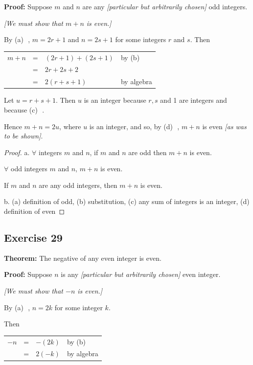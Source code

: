 \documentclass[14pt]{extarticle}
\newcommand{\fbl}{\underline{\hspace{1cm}}\,\,}
\newcommand{\fa}{\forall}
\newcommand{\cy}{\color{cyan}}
\begin{document}
{\bf Proof:} Suppose $m$ and $n$ are any {\it [particular but arbitrarily chosen]} odd integers. 

{\it [We must show that $m + n$ is even.]}

By {\cy (a)} \fbl, $m = 2r + 1$ and $n = 2s + 1$ for some integers $r$ and $s$. Then

\begin{center}
\begin{tabular}{rcll}
$m+n$ & = & $(2r+1) + (2s+1)$ & {\cy by (b)} \fbl \\
& = & $2r + 2s + 2$ & \\
& = & $2(r+s+1)$ & \cy by algebra \\
\end{tabular}
\end{center}

Let $u = r + s + 1$. Then $u$ is an integer because $r, s$ and 1 are integers and because {\cy (c)} \fbl. 

Hence $m + n = 2u$, where $u$ is an integer, and so, by {\cy (d)} \fbl, $m + n$ is even {\it [as was to be shown]}.

\begin{proof}
a. $\fa$ integers $m$ and $n$, if $m$ and $n$ are odd then $m + n$ is even.

$\fa$ odd integers $m$ and $n$, $m + n$ is even.

If $m$ and $n$ are any odd integers, then $m + n$ is even.

b. (a) definition of odd, (b) substitution, (c) any sum of
integers is an integer, (d) definition of even
\end{proof}

\subsection{Exercise 29}
{\bf Theorem:} The negative of any even integer is even.

{\bf Proof:} Suppose $n$ is any {\it [particular but arbitrarily chosen]} even integer. 

{\it [We must show that $-n$ is even.]}

By {\cy (a)} \fbl, $n = 2k$ for some integer $k$.

Then

\begin{center}
\begin{tabular}{rcll}
$-n$ & = & $-(2k)$ & \cy by (b) \fbl \\
& = & $2(-k)$ & \cy by algebra \\
\end{tabular}
\end{center}
\end{document}
